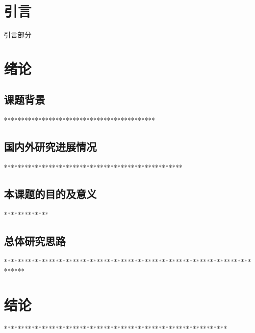 \documentclass[12pt,a4paper]{article}
\begin{document}
{
\setlength{\baselineskip}{23pt}


\section*{引\quad 言}

引言部分


\newpage
\setcounter{section}{1}
\section{绪论}


\subsection{课题背景}
********************************************
\subsection{国内外研究进展情况}
****************************************************

\subsection{本课题的目的及意义}
*************

\subsection{总体研究思路}

******************************************************************************



\newpage
\section*{结论}
\setcounter{结论编号}{\value{section}} %
\addtocounter{结论编号}{1}
*****************************************************************


}
\end{document}
